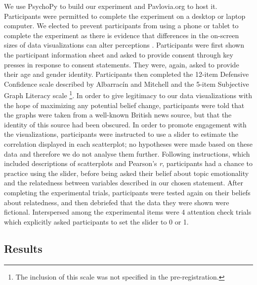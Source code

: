 \documentclass[manuscript,screen,review,anonymous]{acmart}
\begin{document}
We use PsychoPy \citep{pierce_2019} to build our experiment and
Pavlovia.org to host it. Participants were permitted to complete the
experiment on a desktop or laptop computer. We elected to prevent
participants from using a phone or tablet to complete the experiment as
there is evidence that differences in the on-screen sizes of data
visualizations can alter perceptions \citep{cleveland_1982}.
Participants were first shown the participant information sheet and
asked to provide consent through key presses in response to consent
statements. They were, again, asked to provide their age and gender
identity. Participants then completed the 12-item Defensive Confidence
scale described by Albarracín and Mitchell \citep{albarracin_2004} and
the 5-item Subjective Graph Literacy scale \citep{garcia_2016}
\footnote{The inclusion of this scale was not specified in the
  pre-registration.}. In order to give legitimacy to our data
visualizations with the hope of maximizing any potential belief change,
participants were told that the graphs were taken from a well-known
British news source, but that the identity of this source had been
obscured. In order to promote engagement with the visualizations,
participants were instructed to use a slider to estimate the correlation
displayed in each scatterplot; no hypotheses were made based on these
data and therefore we do not analyse them further. Following
instructions, which included descriptions of scatterplots and Pearson's
\emph{r}, participants had a chance to practice using the slider, before
being asked their belief about topic emotionality and the relatedness
between variables described in our chosen statement. After completing
the experimental trials, participants were tested again on their beliefs
about relatedness, and then debriefed that the data they were shown were
fictional. Interspersed among the experimental items were 4 attention
check trials which explicitly asked participants to set the slider to 0
or 1.

\subsection{Results}\label{sec-results-main}
\end{document}
